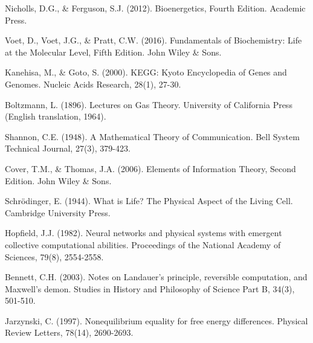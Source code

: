 \documentclass[12pt,a4paper]{article}
\begin{document}
\begin{thebibliography}{99}
Nicholls, D.G., \& Ferguson, S.J. (2012). Bioenergetics, Fourth Edition. Academic Press.

Voet, D., Voet, J.G., \& Pratt, C.W. (2016). Fundamentals of Biochemistry: Life at the Molecular Level, Fifth Edition. John Wiley \& Sons.

Kanehisa, M., \& Goto, S. (2000). KEGG: Kyoto Encyclopedia of Genes and Genomes. Nucleic Acids Research, 28(1), 27-30.

Boltzmann, L. (1896). Lectures on Gas Theory. University of California Press (English translation, 1964).

Shannon, C.E. (1948). A Mathematical Theory of Communication. Bell System Technical Journal, 27(3), 379-423.

Cover, T.M., \& Thomas, J.A. (2006). Elements of Information Theory, Second Edition. John Wiley \& Sons.

Schrödinger, E. (1944). What is Life? The Physical Aspect of the Living Cell. Cambridge University Press.

Hopfield, J.J. (1982). Neural networks and physical systems with emergent collective computational abilities. Proceedings of the National Academy of Sciences, 79(8), 2554-2558.

Bennett, C.H. (2003). Notes on Landauer's principle, reversible computation, and Maxwell's demon. Studies in History and Philosophy of Science Part B, 34(3), 501-510.

Jarzynski, C. (1997). Nonequilibrium equality for free energy differences. Physical Review Letters, 78(14), 2690-2693.

\end{thebibliography}
\end{document}

